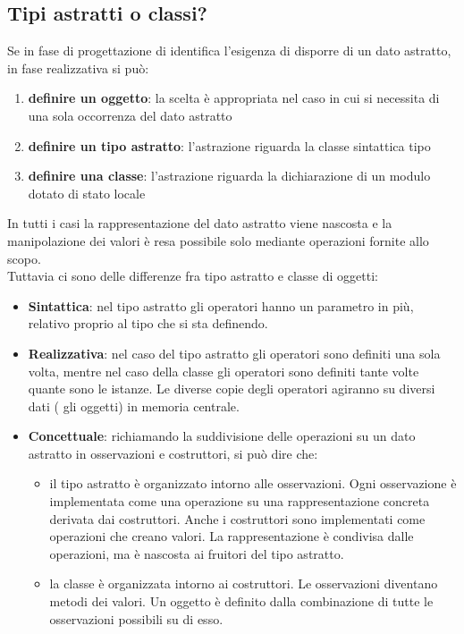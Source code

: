\documentclass{article}
\begin{document}
	\subsection{Tipi astratti o classi?}
	Se in fase di progettazione di identifica l'esigenza di disporre di un dato astratto, in fase realizzativa si può:
	\begin{enumerate}
		\item \textbf{definire un oggetto}: la scelta è appropriata nel caso in cui si necessita di una sola occorrenza del dato astratto
		\item \textbf{definire un tipo astratto}: l'astrazione riguarda la classe sintattica tipo
		\item \textbf{definire una classe}: l'astrazione riguarda la dichiarazione di un modulo dotato di stato locale
	\end{enumerate}
	In tutti i casi la rappresentazione del dato astratto viene nascosta e la manipolazione dei valori è resa possibile solo mediante operazioni fornite allo scopo. \\
	Tuttavia ci sono delle differenze fra tipo astratto e classe di oggetti:
	\begin{itemize}
		\item \textbf{Sintattica}: nel tipo astratto gli operatori hanno un parametro in più, relativo proprio al tipo che si sta definendo.
		\item \textbf{Realizzativa}: nel caso del tipo astratto gli operatori sono definiti una sola volta, mentre nel caso della classe gli operatori sono definiti tante volte quante sono le istanze. Le diverse copie degli operatori agiranno su diversi dati ( gli oggetti) in memoria centrale.
		\item \textbf{Concettuale}: richiamando la suddivisione delle operazioni su un dato astratto in osservazioni e costruttori, si può dire che:
		\begin{itemize}
			\item il tipo astratto è organizzato intorno alle osservazioni. Ogni osservazione è implementata come una operazione su una rappresentazione concreta derivata dai costruttori. Anche i costruttori sono implementati come operazioni che creano valori. La rappresentazione è condivisa dalle operazioni, ma è nascosta ai fruitori del tipo astratto.
			\item la classe è organizzata intorno ai costruttori. Le osservazioni diventano metodi dei valori. Un oggetto è definito dalla combinazione di tutte le osservazioni possibili su di esso.
		\end{itemize}
	\end{itemize}
\end{document}
